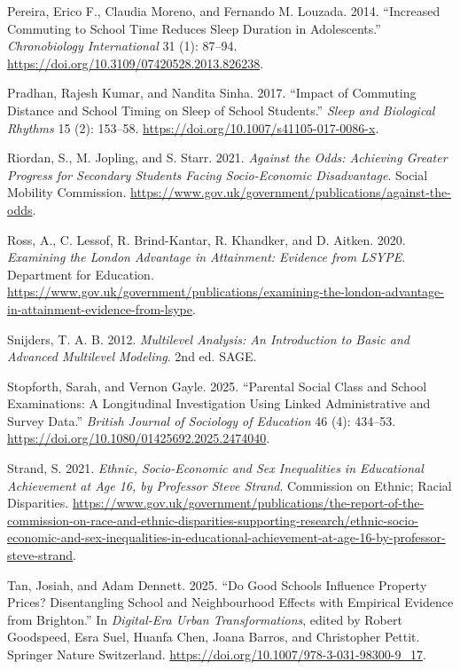 \documentclass[
  12pt,
  titlepage]{article}
\newlength{\cslhangindent}
\newenvironment{CSLReferences}[2] %
 {\begin{list}{}{%
  \setlength{\itemindent}{0pt}
  \setlength{\leftmargin}{0pt}
  \setlength{\parsep}{0pt}
  \ifodd #1
   \setlength{\leftmargin}{\cslhangindent}
   \setlength{\itemindent}{-1\cslhangindent}
  \fi
  \setlength{\itemsep}{#2\baselineskip}}}
 {\end{list}}
\begin{document}
\begin{CSLReferences}{1}{1}
Pereira, Erico F., Claudia Moreno, and Fernando M. Louzada. 2014.
{``Increased Commuting to School Time Reduces Sleep Duration in
Adolescents.''} \emph{Chronobiology International} 31 (1): 87--94.
\url{https://doi.org/10.3109/07420528.2013.826238}.

Pradhan, Rajesh Kumar, and Nandita Sinha. 2017. {``Impact of Commuting
Distance and School Timing on Sleep of School Students.''} \emph{Sleep
and Biological Rhythms} 15 (2): 153--58.
\url{https://doi.org/10.1007/s41105-017-0086-x}.

Riordan, S., M. Jopling, and S. Starr. 2021. \emph{Against the Odds:
Achieving Greater Progress for Secondary Students Facing Socio-Economic
Disadvantage}. Social Mobility Commission.
\url{https://www.gov.uk/government/publications/against-the-odds}.

Ross, A., C. Lessof, R. Brind-Kantar, R. Khandker, and D. Aitken. 2020.
\emph{Examining the {London} Advantage in Attainment: Evidence from
{LSYPE}}. Department for Education.
\url{https://www.gov.uk/government/publications/examining-the-london-advantage-in-attainment-evidence-from-lsype}.

Snijders, T. A. B. 2012. \emph{Multilevel Analysis: An Introduction to
Basic and Advanced Multilevel Modeling}. 2nd ed. SAGE.

Stopforth, Sarah, and Vernon Gayle. 2025. {``Parental Social Class and
School Examinations: A Longitudinal Investigation Using Linked
Administrative and Survey Data.''} \emph{British Journal of Sociology of
Education} 46 (4): 434--53.
\url{https://doi.org/10.1080/01425692.2025.2474040}.

Strand, S. 2021. \emph{Ethnic, Socio-Economic and Sex Inequalities in
Educational Achievement at Age 16, by {Professor} {Steve} {Strand}}.
Commission on Ethnic; Racial Disparities.
\url{https://www.gov.uk/government/publications/the-report-of-the-commission-on-race-and-ethnic-disparities-supporting-research/ethnic-socio-economic-and-sex-inequalities-in-educational-achievement-at-age-16-by-professor-steve-strand}.

Tan, Josiah, and Adam Dennett. 2025. {``Do {Good} {Schools} {Influence}
{Property} {Prices}? {Disentangling} {School} and {Neighbourhood}
{Effects} with {Empirical} {Evidence} from {Brighton}.''} In
\emph{Digital-{Era} {Urban} {Transformations}}, edited by Robert
Goodspeed, Esra Suel, Huanfa Chen, Joana Barros, and Christopher Pettit.
Springer Nature Switzerland.
\url{https://doi.org/10.1007/978-3-031-98300-9_17}.


\end{CSLReferences}
\end{document}
